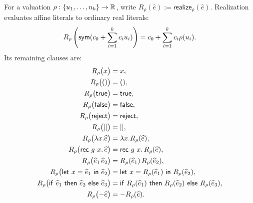 \begin{definition}
For a valuation $\rho:\{u_1,\ldots,u_k\}\to\mathbb{R}$, write
$R_\rho(\widehat e):=\mathsf{realize}_\rho(\widehat e)$.
Realization evaluates affine literals to ordinary real literals:
\[
 R_\rho\left(\mathsf{sym}(c_0+\sum_{i=1}^k c_i u_i)\right)
   =c_0+\sum_{i=1}^k c_i\rho(u_i).
\]
Its remaining clauses are:
\[
\begin{aligned}
  R_\rho\bigl(x\bigr)&=x,\\
  R_\rho\bigl(()\bigr)&=(),\\
  R_\rho\bigl(\mathsf{true}\bigr)&=\mathsf{true},\\
  R_\rho\bigl(\mathsf{false}\bigr)&=\mathsf{false},\\
  R_\rho\bigl(\mathsf{reject}\bigr)&=\mathsf{reject},\\
  R_\rho\bigl([]\bigr)&=[],\\
  R_\rho\bigl(\lambda x.\widehat e\bigr)&=\lambda x.R_\rho(\widehat e),\\
  R_\rho\bigl(\mathsf{rec}\ g\ x.\,\widehat e\bigr)&=\mathsf{rec}\ g\ x.\,R_\rho(\widehat e),\\
  R_\rho\bigl(\widehat e_1\,\widehat e_2\bigr)&=R_\rho(\widehat e_1)\,R_\rho(\widehat e_2),\\
  R_\rho\bigl(\mathsf{let}\ x=\widehat e_1\ \mathsf{in}\ \widehat e_2\bigr)&=\mathsf{let}\ x=R_\rho(\widehat e_1)\ \mathsf{in}\ R_\rho(\widehat e_2),\\
  R_\rho\bigl(\mathsf{if}\ \widehat e_1\ \mathsf{then}\ \widehat e_2\ \mathsf{else}\ \widehat e_3\bigr)&=\mathsf{if}\ R_\rho(\widehat e_1)\ \mathsf{then}\ R_\rho(\widehat e_2)\ \mathsf{else}\ R_\rho(\widehat e_3),\\
  R_\rho\bigl(-\widehat e\bigr)&=-R_\rho(\widehat e).
\end{aligned}
\]


\end{definition}
